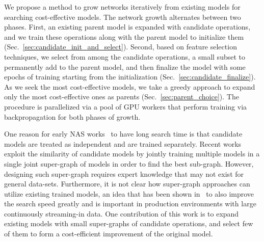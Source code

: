 We propose a method to grow networks iteratively from existing models for searching cost-effective models. 
The network growth alternates between two phases. First, an existing parent model is expanded with candidate operations, and we train these operations along with the parent model to initialize them (Sec.~\ref{sec:candidate_init_and_select}). Second, based on feature selection techniques, we select from among the candidate operations, a small subset to permanently add to the parent model, and then finalize the model with some epochs of training starting from the initialization (Sec.~\ref{sec:candidate_finalize}). As we seek the most cost-effective models, we take a greedy approach to expand only the most cost-effective ones as parents (Sec.~\ref{sec:parent_choice}). 
The procedure is parallelized via a pool of GPU workers that perform training via backpropagation for both phases of growth. 

One reason for early NAS works~\citep{nas,NASCell,Real2018RegularizedEF} to have long search time is that candidate models are treated as independent and are trained separately. Recent works~\citep{Pham2018EfficientNA, Liu2018DARTSDA} exploit the similarity of candidate models by jointly training multiple models in a single joint super-graph of models in order to find the best sub-graph. However, designing such super-graph requires expert knowledge that may not exist for general data-sets. Furthermore, it is not clear how super-graph approaches can utilize existing trained models, an idea that has been shown in~\citep{Elsken2018EfficientMN} to also improve the search speed greatly and is important in production environments with large continuously streaming-in data. One contribution of this work is to expand existing models with small super-graphs of candidate operations, and select few of them to form a cost-efficient improvement of the original model. 



